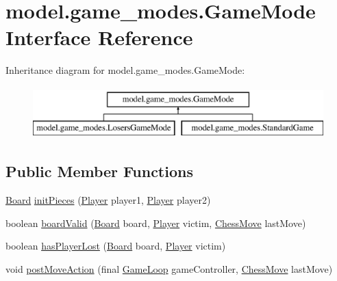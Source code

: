 \hypertarget{interfacemodel_1_1game__modes_1_1_game_mode}{\section{model.\-game\-\_\-modes.\-Game\-Mode Interface Reference}
\label{interfacemodel_1_1game__modes_1_1_game_mode}
}
Inheritance diagram for model.\-game\-\_\-modes.\-Game\-Mode\-:\begin{figure}[H]
\begin{center}
\leavevmode
\includegraphics[height=2.000000cm]{interfacemodel_1_1game__modes_1_1_game_mode}
\end{center}
\end{figure}
\subsection*{Public Member Functions}
\begin{DoxyCompactItemize}
\item 
\hyperlink{classmodel_1_1board_1_1_board}{Board} \hyperlink{interfacemodel_1_1game__modes_1_1_game_mode_a237818232e386862838f6b507299497b}{init\-Pieces} (\hyperlink{classcontroller_1_1_player}{Player} player1, \hyperlink{classcontroller_1_1_player}{Player} player2)
\item 
boolean \hyperlink{interfacemodel_1_1game__modes_1_1_game_mode_ab953f82866d9146bde4a2de96af7c308}{board\-Valid} (\hyperlink{classmodel_1_1board_1_1_board}{Board} board, \hyperlink{classcontroller_1_1_player}{Player} victim, \hyperlink{classmodel_1_1_chess_move}{Chess\-Move} last\-Move)
\item 
boolean \hyperlink{interfacemodel_1_1game__modes_1_1_game_mode_adaba2585b6c82e7e14532692db14898f}{has\-Player\-Lost} (\hyperlink{classmodel_1_1board_1_1_board}{Board} board, \hyperlink{classcontroller_1_1_player}{Player} victim)
\item 
void \hyperlink{interfacemodel_1_1game__modes_1_1_game_mode_a034774ac426a436f2c19e7afc8eb8747}{post\-Move\-Action} (final \hyperlink{classcontroller_1_1_game_loop}{Game\-Loop} game\-Controller, \hyperlink{classmodel_1_1_chess_move}{Chess\-Move} last\-Move)
\end{DoxyCompactItemize}


